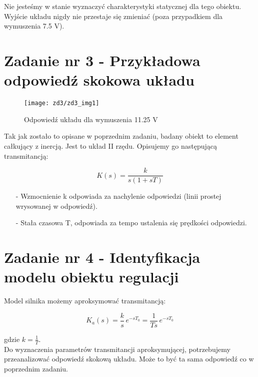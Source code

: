 \documentclass[11 pt]{article}
\begin{document}
Nie jesteśmy w stanie wyznaczyć charakterystyki statycznej dla tego obiektu. Wyjście układu nigdy nie przestaje się zmieniać (poza przypadkiem dla wymuszenia 7.5 V).

\newpage

\setcounter{section}{3}
\setcounter{figure}{0}
\section*{Zadanie nr 3 - Przykładowa odpowiedź skokowa układu}

\begin{figure}[h!]
	\center
	\texttt{[image: zd3/zd3\_img1]}
	\caption{Odpowiedź układu dla wymuszenia 11.25 V}
\end{figure}

Tak jak zostało to opisane w poprzednim zadaniu, badany obiekt to element całkujący z inercją. Jest to układ II rzędu. Opisujemy go następującą transmitancją:

\begin{equation*}
K(s) = \frac{k}{s(1 + sT)}
\end{equation*}

\begin{itemize}
\item[-] Wzmocnienie k odpowiada za nachylenie odpowiedzi (linii prostej wrysowanej w odpowiedź).
\item[-] Stała czasowa T, odpowiada za tempo ustalenia się prędkości odpowiedzi.
\end{itemize}

\newpage

\setcounter{section}{4}
\setcounter{figure}{0}
\section*{Zadanie nr 4 - Identyfikacja modelu obiektu regulacji}

Model silnika możemy aproksymować transmitancją:

\begin{equation*}
K_a(s) = \frac{k}{s} \, e^{-s T_0} = \frac{1}{Ts} \, e^{-s T_0}
\end{equation*}

gdzie $k = \displaystyle \frac{1}{T}$.\\

Do wyznaczenia parametrów transmitancji aproksymującej, potrzebujemy przeanalizować odpowiedź skokową układu. Może to być ta sama odpowiedź co w poprzednim zadaniu.
\end{document}
